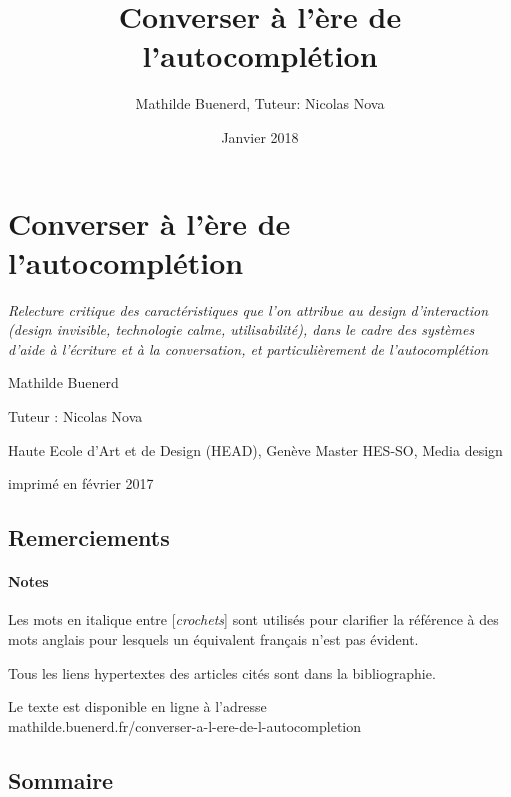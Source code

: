 \documentclass[]{article}
\title{Converser à l'ère de l'autocomplétion}
\author{Mathilde Buenerd, Tuteur: Nicolas Nova}
\date{Janvier 2018}
\let\oldparagraph\paragraph
\renewcommand{\paragraph}[1]{\oldparagraph{#1}\mbox{}}
\begin{document}
\maketitle

\newpage

\hypertarget{converser-uxe0-luxe8re-de-lautocompluxe9tion}{%
\section{Converser à l'ère de
l'autocomplétion}\label{converser-uxe0-luxe8re-de-lautocompluxe9tion}}

\emph{Relecture critique des caractéristiques que l'on attribue au
design d'interaction (\emph{design invisible}, \emph{technologie calme},
\emph{utilisabilité}), dans le cadre des systèmes d'aide à l'écriture et
à la conversation, et particulièrement de l'autocomplétion}

Mathilde Buenerd

Tuteur : Nicolas Nova

Haute Ecole d'Art et de Design (HEAD), Genève Master HES-SO, Media
design

imprimé en février 2017

\newpage

\hypertarget{remerciements}{%
\subsection{Remerciements}\label{remerciements}}

\newpage

\hypertarget{notes}{%
\paragraph{Notes}\label{notes}}

Les mots en italique entre {[}\emph{crochets}{]} sont utilisés pour
clarifier la référence à des mots anglais pour lesquels un équivalent
français n'est pas évident.

Tous les liens hypertextes des articles cités sont dans la
bibliographie.

Le texte est disponible en ligne à l'adresse\\
mathilde.buenerd.fr/converser-a-l-ere-de-l-autocompletion

\newpage

\hypertarget{sommaire}{%
\subsection{Sommaire}\label{sommaire}}
\end{document}
